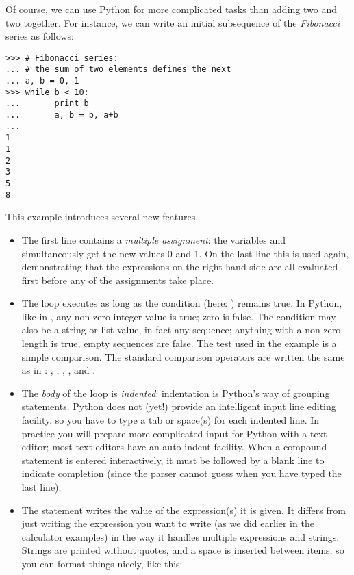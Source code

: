 \documentclass{manual}
\begin{document}
Of course, we can use Python for more complicated tasks than adding
two and two together.  For instance, we can write an initial
subsequence of the \emph{Fibonacci} series as follows:

\begin{verbatim}
>>> # Fibonacci series:
... # the sum of two elements defines the next
... a, b = 0, 1
>>> while b < 10:
...       print b
...       a, b = b, a+b
... 
1
1
2
3
5
8
\end{verbatim}

This example introduces several new features.

\begin{itemize}

\item
The first line contains a \emph{multiple assignment}: the variables
 and  simultaneously get the new values 0 and 1.  On the
last line this is used again, demonstrating that the expressions on
the right-hand side are all evaluated first before any of the
assignments take place.

\item
The  loop executes as long as the condition (here:
) remains true.  In Python, like in \C{}, any non-zero
integer value is true; zero is false.  The condition may also be a
string or list value, in fact any sequence; anything with a non-zero
length is true, empty sequences are false.  The test used in the
example is a simple comparison.  The standard comparison operators are
written the same as in \C{}: \code{<}, \code{>}, \code{==}, \code{<=},
\code{>=} and \code{!=}.

\item
The \emph{body} of the loop is \emph{indented}: indentation is Python's
way of grouping statements.  Python does not (yet!) provide an
intelligent input line editing facility, so you have to type a tab or
space(s) for each indented line.  In practice you will prepare more
complicated input for Python with a text editor; most text editors have
an auto-indent facility.  When a compound statement is entered
interactively, it must be followed by a blank line to indicate
completion (since the parser cannot guess when you have typed the last
line).

\item
The  statement writes the value of the expression(s) it is
given.  It differs from just writing the expression you want to write
(as we did earlier in the calculator examples) in the way it handles
multiple expressions and strings.  Strings are printed without quotes,
and a space is inserted between items, so you can format things nicely,
like this:


\end{itemize}
\end{document}
